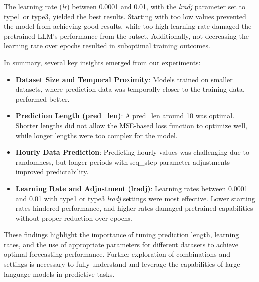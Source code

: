 The learning rate (\textit{lr}) between 0.0001 and 0.01, with the \textit{lradj} parameter set to type1 or type3, yielded the best results. Starting with too low values prevented the model from achieving good results, while too high learning rate damaged the pretrained LLM’s performance from the outset. Additionally, not decreasing the learning rate over epochs resulted in suboptimal training outcomes.

In summary, several key insights emerged from our experiments:

\begin{itemize}
	\item \textbf{Dataset Size and Temporal Proximity}: Models trained on smaller datasets, where prediction data was temporally closer to the training data, performed better.
	\item \textbf{Prediction Length (pred\_len)}: A pred\_len around 10 was optimal. Shorter lengths did not allow the MSE-based loss function to optimize well, while longer lengths were too complex for the model.
	\item \textbf{Hourly Data Prediction}: Predicting hourly values was challenging due to randomness, but longer periods with seq\_step parameter adjustments improved predictability.
	\item \textbf{Learning Rate and Adjustment (lradj)}: Learning rates between 0.0001 and 0.01 with type1 or type3 \textit{lradj} settings were most effective. Lower starting rates hindered performance, and higher rates damaged pretrained capabilities without proper reduction over epochs.
\end{itemize}

These findings highlight the importance of tuning prediction length, learning rates, and the use of appropriate parameters for different datasets to achieve optimal forecasting performance. Further exploration of combinations and settings is necessary to fully understand and leverage the capabilities of large language models in predictive tasks.

